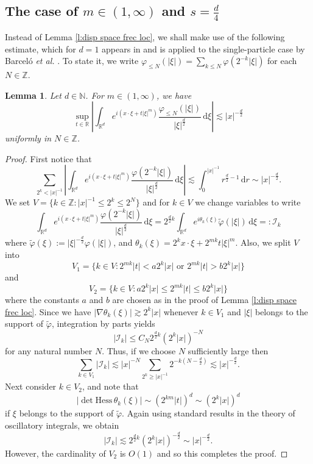 \documentclass[a4paper]{amsart}
\numberwithin{equation}{section}%
\theoremstyle{plain}%
\newtheorem{lemma}[theorem]{Lemma}
\theoremstyle{definition}
\theoremstyle{remark}%
\def\d{\mathrm{d}}
\begin{document}
\subsection*{The case of $m\in(1,\infty)$ and $s=\frac d4$}
Instead of Lemma \ref{l:disp space frec loc}, we shall make use of the following estimate, which for $d=1$ appears in \cite{Sjolin} and is applied to the single-particle case by Barcel\'o \textit{et al.} \cite{BBCR}. 
To state it, we write $\varphi_{\leq N}(|\xi|)=\sum_{k\leq N} \varphi(2^{-k}|\xi|)$ for each $N\in \mathbb Z$. 

\begin{lemma}\label{l:disp space}
Let $d\in\mathbb N$. For $m\in(1,\infty)$, we have 
\[
\sup_{t\in\mathbb R}\left|\int_{\mathbb R^d} e^{i(x\cdot \xi+t|\xi|^m)}\frac{\varphi_{\leq N}(|\xi|)}{|\xi|^{\frac{d}{2}}}\,\d\xi\right|
\lesssim
|x|^{-\frac{d}{2}}
\]
uniformly in $N\in\mathbb Z$.
\end{lemma}

\begin{proof}
First notice that
\[
    \sum_{2^k<|x|^{-1}} \left|\int_{\mathbb R^d} e^{i(x\cdot\xi+t|\xi|^m)}      \frac{\varphi(2^{-k}|\xi|)}{|\xi|^{\frac{d}{2}}}
\, \mathrm{d} \xi\right|
    \lesssim
    \int_0^{|x|^{-1}} r^{\frac{d}{2}-1}\, \mathrm{d} r
    \sim 
    |x|^{-\frac{d}{2}}. 
\]
We set $V = \{k\in\mathbb Z:|x|^{-1} \leq 2^k \leq 2^N\}$ and for $k \in V$ we change variables to write
\[
\int_{\mathbb R^d} e^{i(x\cdot\xi+t|\xi|^m)}      \frac{\varphi(2^{-k}|\xi|)}{|\xi|^{\frac{d}{2}}}
\, \mathrm{d} \xi 
=
2^{\frac{d}{2}k}
\int_{\mathbb R^d} e^{i\theta_k(\xi)}
    \widetilde{\varphi}(|\xi|)
    \,\mathrm{d} \xi =: \mathcal{I}_k
\]
where $\widetilde{\varphi}(\xi) := |\xi|^{-\frac{d}{2}}\varphi(|\xi|)$, and $\theta_k(\xi) = 2^k x \cdot \xi + 2^{mk} t |\xi|^m$. Also, we split $V$ into
\[
V_1
=
\{
k\in V : 2^{mk}|t| < a2^k|x|\,\, \text{or} \,\, 2^{mk}|t| > b2^k|x|
\}
\]
and 
\[
V_2
=
\{
k\in V :  a 2^k|x| \leq 2^{mk}|t| \leq  b 2^k|x|
\}
\]
where the constants $a$ and $b$ are chosen as in the proof of Lemma \ref{l:disp space frec loc}. Since we have $|\nabla \theta_k(\xi)| \gtrsim 2^k|x|$ whenever $k \in V_1$ and $|\xi|$ belongs to the support of $\widetilde{\varphi}$, integration by parts yields
\[
|\mathcal{I}_k| \leq C_N 2^{\frac{d}{2}k}(2^k|x|)^{-N}
\]
for any natural number $N$. Thus, if we choose $N$ sufficiently large then
\[
\sum_{k \in V_1} |\mathcal{I}_k| \lesssim |x|^{-N} \sum_{2^k \geq |x|^{-1}} 2^{-k(N - \frac{d}{2})} \lesssim |x|^{-\frac{d}{2}}.
 \]
Next consider $k \in V_2$, and note that
\[
| \det \mathrm{Hess} \, \theta_k (\xi)| \sim (2^{km}|t|)^d \sim (2^k|x|)^d
\]
if $\xi$ belongs to the support of $\widetilde{\varphi}$. Again using standard results in the theory of oscillatory integrals, we obtain
\[
|\mathcal{I}_k| \lesssim 2^{\frac{d}{2}k} (2^k|x|)^{-\frac{d}{2}} \sim |x|^{-\frac{d}{2}}.
\]
However, the cardinality of $V_2$ is $O(1)$ and so this completes the proof.
\end{proof}
\end{document}
